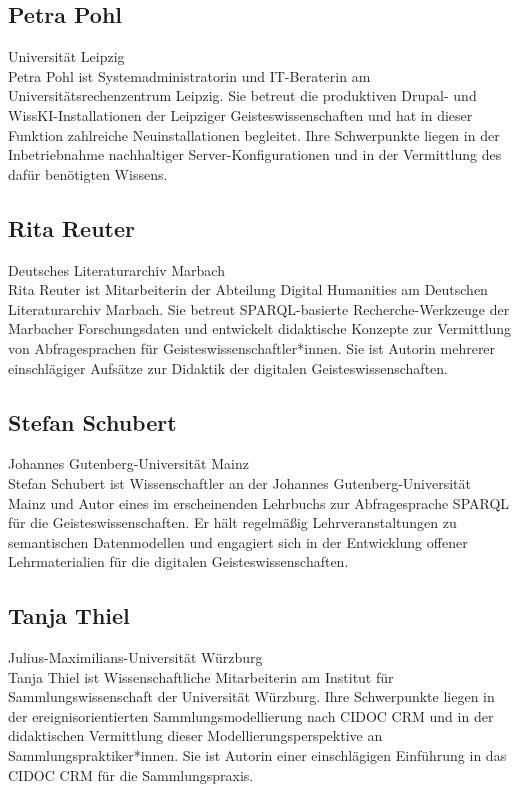 \subsection*{Petra Pohl}
\noindent\small Universität Leipzig \\
Petra Pohl ist Systemadministratorin und IT-Beraterin am Universitätsrechenzentrum Leipzig. Sie betreut die produktiven Drupal- und WissKI-Installationen der Leipziger Geisteswissenschaften und hat in dieser Funktion zahlreiche Neuinstallationen begleitet. Ihre Schwerpunkte liegen in der Inbetriebnahme nachhaltiger Server-Konfigurationen und in der Vermittlung des dafür benötigten Wissens.

\subsection*{Rita Reuter}
\noindent\small Deutsches Literaturarchiv Marbach \\
Rita Reuter ist Mitarbeiterin der Abteilung Digital Humanities am Deutschen Literaturarchiv Marbach. Sie betreut SPARQL-basierte Recherche-Werkzeuge der Marbacher Forschungsdaten und entwickelt didaktische Konzepte zur Vermittlung von Abfragesprachen für Geisteswissenschaftler*innen. Sie ist Autorin mehrerer einschlägiger Aufsätze zur Didaktik der digitalen Geisteswissenschaften.

\subsection*{Stefan Schubert}
\noindent\small Johannes Gutenberg-Universität Mainz \\
Stefan Schubert ist Wissenschaftler an der Johannes Gutenberg-Universität Mainz und Autor eines im erscheinenden Lehrbuchs zur Abfragesprache SPARQL für die Geisteswissenschaften. Er hält regelmäßig Lehrveranstaltungen zu semantischen Datenmodellen und engagiert sich in der Entwicklung offener Lehrmaterialien für die digitalen Geisteswissenschaften.

\subsection*{Tanja Thiel}
\noindent\small Julius-Maximilians-Universität Würzburg \\
Tanja Thiel ist Wissenschaftliche Mitarbeiterin am Institut für Sammlungswissenschaft der Universität Würzburg. Ihre Schwerpunkte liegen in der ereignisorientierten Sammlungsmodellierung nach CIDOC CRM und in der didaktischen Vermittlung dieser Modellierungsperspektive an Sammlungspraktiker*innen. Sie ist Autorin einer einschlägigen Einführung in das CIDOC CRM für die Sammlungspraxis.

